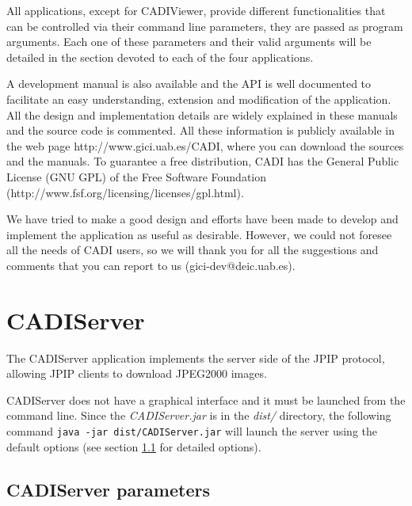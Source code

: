 \documentclass[a4paper,10pt]{article}
\begin{document}
All applications, except for CADIViewer, provide different functionalities that
can be controlled via their command line parameters, they are passed as program
arguments. Each one of these parameters and their valid arguments will be
detailed in the section devoted to each of the four applications.


A development	manual is also available and the API is well documented
to facilitate an easy understanding, extension and modification of
the application. All the design and implementation details are widely
explained in these manuals and the source code is commented. All
these information is publicly available in the web page
http://www.gici.uab.es/CADI, where you can download the sources and
the manuals. To guarantee a free distribution, CADI has the General
Public License (GNU GPL) of the Free Software Foundation
(http://www.fsf.org/licensing/licenses/gpl.html).  

We have tried to make a good design and efforts have been made to
develop and implement the application as useful as
desirable. However, we could not foresee all the needs of CADI
users, so we will thank you for all the suggestions and comments
that you can report to us (gici-dev@deic.uab.es). 

\flushleft{} 


\newpage
\section{CADIServer}
\label{sect:server}

The CADIServer application implements the server side of the JPIP protocol,
allowing JPIP clients to download JPEG2000 images.

CADIServer does not have a graphical interface and it must be launched from the
command line. Since the \emph{CADIServer.jar} is in the \emph{dist/} directory,
the following command {\tt java -jar dist/CADIServer.jar} will launch the server
using the default options (see section \ref{sect:server_parameters} for
detailed options).

\subsection{CADIServer parameters}
\label{sect:server_parameters}
\end{document}

